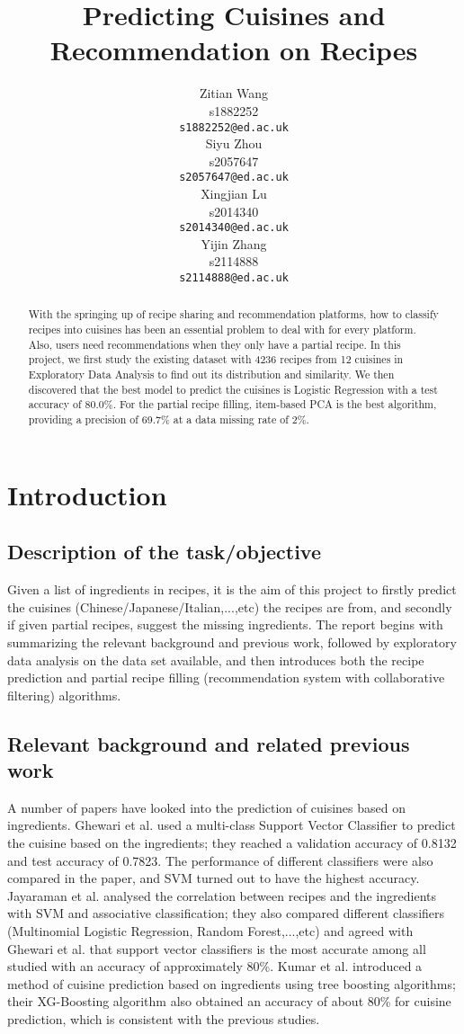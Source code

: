 \documentclass{article}
\title{Predicting Cuisines and Recommendation on Recipes}
\author{
  Zitian Wang\\
  s1882252\\
  \texttt{s1882252@ed.ac.uk} \\
  \And
  Siyu Zhou\\
  s2057647\\
  \texttt{s2057647@ed.ac.uk} \\
 \And
  Xingjian Lu\\
  s2014340\\
  \texttt{s2014340@ed.ac.uk} \\
 \And
  Yijin Zhang\\
  s2114888\\
  \texttt{s2114888@ed.ac.uk}\\
}
\begin{document}
\maketitle

\begin{abstract}
 With the springing up of recipe sharing and recommendation platforms, how to classify recipes into cuisines has been an essential problem to deal with for every platform. Also, users need recommendations when they only have a partial recipe. In this project, we first study the existing dataset with 4236 recipes from 12 cuisines in Exploratory Data Analysis to find out its distribution and similarity. We then discovered that the best model to predict the cuisines is Logistic Regression with a test accuracy of 80.0\%. For the partial recipe filling, item-based PCA is the best algorithm, providing a precision of 69.7\% at a data missing rate of 2\%.
\end{abstract}

\section{Introduction}
\subsection{Description of the task/objective}

Given a list of ingredients in recipes, it is the aim of this project to firstly predict the cuisines (Chinese/Japanese/Italian,...,etc) the recipes are from, and secondly if given partial recipes, suggest the missing ingredients. The report begins with summarizing the relevant background and previous work, followed by exploratory data analysis on the data set available, and then introduces both the recipe prediction and partial recipe filling (recommendation system with collaborative filtering) algorithms. 

\subsection{Relevant background and related previous work}
A number of papers have looked into the prediction of cuisines based on ingredients. Ghewari et al.
\cite{ghewari2015predicting} 
used a multi-class Support Vector Classifier to predict the cuisine based on the ingredients; they reached a validation accuracy of 0.8132 and test accuracy of 0.7823. The performance of different classifiers were also compared in the paper, and SVM turned out to have the highest accuracy. Jayaraman et al.
\cite{jayaraman2017analysis} 
analysed the correlation between recipes and the ingredients with SVM and associative classification; they also compared different classifiers (Multinomial Logistic Regression, Random Forest,...,etc) and agreed with Ghewari et al. that support vector classifiers is the most accurate among all studied with an accuracy of approximately 80\%. Kumar et al.
\cite{kumar2016cuisine}
introduced a method of cuisine prediction based on ingredients using tree boosting algorithms; their XG-Boosting algorithm also obtained an accuracy of about 80\% for cuisine prediction, which is consistent with the previous studies.
\end{document}
